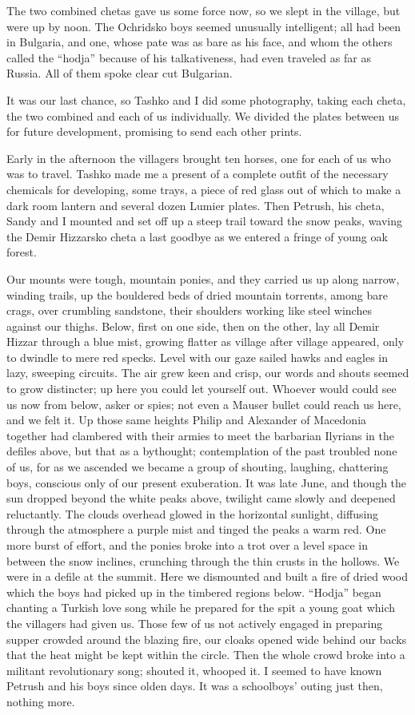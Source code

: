 \documentclass[a5paper,12pt]{book}
\begin{document}
The two combined chetas gave us some force now, so we slept in the village, but were up by noon. The Ochridsko boys seemed unusually intelligent; all had been in Bulgaria, and one, whose pate was as bare as his face, and whom the others called the “hodja” because of his talkativeness, had even traveled as far as Russia. All of them spoke clear cut Bulgarian. 

It was our last chance, so Tashko and I did some photography, taking each cheta, the two combined and each of us individually. We divided the plates between us for future development, promising to send each other prints. 

Early in the afternoon the villagers brought ten horses, one for each of us who was to travel. Tashko made me a present of a complete outfit of the necessary chemicals for developing, some trays, a piece of red glass out of which to make a dark room lantern and several dozen Lumier plates. Then Petrush, his cheta, Sandy and I mounted and set off up a steep trail toward the snow peaks, waving the Demir Hizzarsko cheta a last goodbye as we entered a fringe of young oak forest. 

Our mounts were tough, mountain ponies, and they carried us up along narrow, winding trails, up the bouldered beds of dried mountain torrents, among bare crags, over crumbling sandstone, their shoulders working like steel winches against our thighs. Below, first on one side, then on the other, lay all Demir Hizzar through a blue mist, growing flatter as village after village appeared, only to dwindle to mere red specks. Level with our gaze sailed hawks and eagles in lazy, sweeping circuits. The air grew keen and crisp, our words and shouts seemed to grow distincter; up here you could let yourself out. Whoever would could see us now from below, asker or spies; not even a Mauser bullet could reach us here, and we felt it. Up those same heights Philip and Alexander of Macedonia together had clambered with their armies to meet the barbarian Ilyrians in the defiles above, but that as a bythought; contemplation of the past troubled none of us, for as we ascended we became a group of shouting, laughing, chattering boys, conscious only of our present exuberation.
It was late June, and though the sun dropped beyond the white peaks above, twilight came slowly and deepened reluctantly. The clouds overhead glowed in the horizontal sunlight, diffusing through the atmosphere a purple mist and tinged the peaks a warm red. One more burst of effort, and the ponies broke into a trot over a level space in between the snow inclines, crunching through the thin crusts in the hollows. We were in a defile at the summit. Here we dismounted and built a fire of dried wood which the boys had picked up in the timbered regions below. “Hodja” began chanting a Turkish love song while he prepared for the spit a young goat which the villagers had given us. Those few of us not actively engaged in preparing supper crowded around the blazing fire, our cloaks opened wide behind our backs that the heat might be kept within the circle. Then the whole crowd broke into a militant revolutionary song; shouted it, whooped it. I seemed to have known Petrush and his boys since olden days. It was a schoolboys’ outing just then, nothing more.
\end{document}
